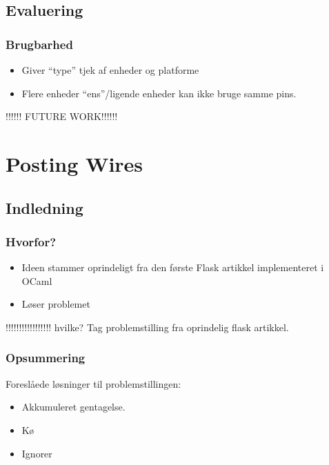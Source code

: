 \documentclass[t]{beamer}
\begin{document}
\subsection{Evaluering}

\begin{frame}
  \frametitle{Brugbarhed}
  
  \begin{itemize}
  \item Giver "`type"' tjek af enheder og platforme

  \item Flere enheder "`ens"'/ligende enheder kan ikke bruge samme pins.
  \end{itemize}


  !!!!!! FUTURE WORK!!!!!!

\end{frame}

\section{Posting Wires}

\subsection{Indledning}

\begin{frame}
  \frametitle{Hvorfor?}

  \begin{itemize}
  \item Ideen stammer oprindeligt fra den første Flask artikkel implementeret i
    OCaml

  \item Løser problemet
  \end{itemize}

!!!!!!!!!!!!!!!!!  hvilke? Tag problemstilling fra oprindelig flask artikkel.

\end{frame}


  
\begin{frame}
  \frametitle{Opsummering}

  Foreslåede løsninger til problemstillingen:

  \begin{itemize}
  \item Akkumuleret gentagelse.
  \item Kø
  \item Ignorer
  \end{itemize}

\end{frame}
\end{document}
